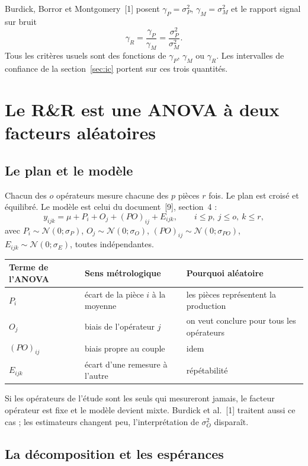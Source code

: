 \documentclass[11pt,a4paper]{article}
\theoremstyle{sj}
\theoremstyle{definition}
\theoremstyle{remark}
\newcommand{\N}{\mathcal{N}}
\newcommand{\gP}{\gamma_P}
\newcommand{\gM}{\gamma_M}
\newcommand{\gR}{\gamma_R}
\begin{document}
Burdick, Borror et Montgomery~[1] posent $\gP=\sigma_P^2$, $\gM=\sigma_M^2$ et le rapport signal sur bruit
\[
\gR=\frac{\gP}{\gM}=\frac{\sigma_P^2}{\sigma_M^2}.
\]
Tous les critères usuels sont des fonctions de $\gP$, $\gM$ ou $\gR$. Les intervalles de confiance de la section~\ref{sec:ic} portent sur ces trois quantités.

\section{Le R\&R est une ANOVA à deux facteurs aléatoires}\label{sec:anova}

\subsection{Le plan et le modèle}

Chacun des $o$ opérateurs mesure chacune des $p$ pièces $r$ fois. Le plan est croisé et équilibré. Le modèle est celui du document~[9], section~4 :
\[
y_{ijk}=\mu+P_i+O_j+(PO)_{ij}+E_{ijk},\qquad i\le p,\ j\le o,\ k\le r,
\]
avec $P_i\sim\N(0;\sigma_P)$, $O_j\sim\N(0;\sigma_O)$, $(PO)_{ij}\sim\N(0;\sigma_{PO})$, $E_{ijk}\sim\N(0;\sigma_E)$, toutes indépendantes.

\begin{center}
\small
\begin{tabular}{l p{5cm} p{5.6cm}}
\toprule
Terme de l'ANOVA & Sens métrologique & Pourquoi aléatoire\\
\midrule
$P_i$ & écart de la pièce $i$ à la moyenne & les pièces représentent la production\\
$O_j$ & biais de l'opérateur $j$ & on veut conclure pour tous les opérateurs\\
$(PO)_{ij}$ & biais propre au couple & idem\\
$E_{ijk}$ & écart d'une remesure à l'autre & répétabilité\\
\bottomrule
\end{tabular}
\end{center}

Si les opérateurs de l'étude sont les seuls qui mesureront jamais, le facteur opérateur est fixe et le modèle devient mixte. Burdick et al.~[1] traitent aussi ce cas ; les estimateurs changent peu, l'interprétation de $\sigma_O^2$ disparaît.

\subsection{La décomposition et les espérances}
\end{document}
